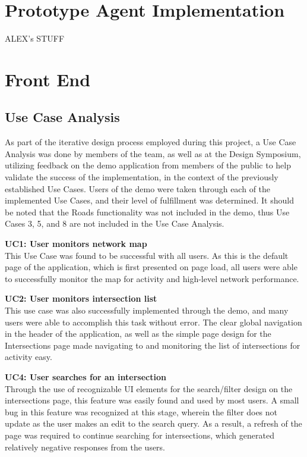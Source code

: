 \documentclass{report}
\begin{document}
\section{Prototype Agent Implementation}
ALEX's STUFF

\section{Front End}
\subsection{Use Case Analysis}
As part of the iterative design process employed during this project, a Use Case Analysis was done by members of the team, as well as at the Design Symposium, utilizing feedback on the demo application from members of the public to help validate the success of the implementation, in the context of the previously established Use Cases.
Users of the demo were taken through each of the implemented Use Cases, and their level of fulfillment was determined.
It should be noted that the Roads functionality was not included in the demo, thus Use Cases 3, 5, and 8 are not included in the Use Case Analysis.

\noindent \textbf{UC1: User monitors network map} \\
This Use Case was found to be successful with all users.
As this is the default page of the application, which is first presented on page load, all users were able to successfully monitor the map for activity and high-level network performance.

\noindent \textbf{UC2: User monitors intersection list} \\
This use case was also successfully implemented through the demo, and many users were able to accomplish this task without error.
The clear global navigation in the header of the application, as well as the simple page design for the Intersections page made navigating to and monitoring the list of intersections for activity easy.

\noindent \textbf{UC4: User searches for an intersection} \\
Through the use of  recognizable UI elements for the search/filter design on the intersections page, this feature was easily found and used by most users.
A small bug in this feature was recognized at this stage, wherein the filter does not update as the user makes an edit to the search query. 
As a result, a refresh of the page was required to continue searching for intersections, which generated relatively negative responses from the users.
\end{document}
